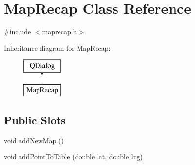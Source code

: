 \hypertarget{class_map_recap}{}\section{Map\+Recap Class Reference}
\label{class_map_recap}


{\ttfamily \#include $<$maprecap.\+h$>$}

Inheritance diagram for Map\+Recap\+:\begin{figure}[H]
\begin{center}
\leavevmode
\includegraphics[height=2.000000cm]{class_map_recap}
\end{center}
\end{figure}
\subsection*{Public Slots}
\begin{DoxyCompactItemize}
\item 
void \hyperlink{class_map_recap_aeaf4d37a45ad4e4b7d9747473c900531}{add\+New\+Map} ()
\item 
void \hyperlink{class_map_recap_a1c98beb9687a394d68e41fd39580edfe}{add\+Point\+To\+Table} (double lat, double lng)
\end{DoxyCompactItemize}
